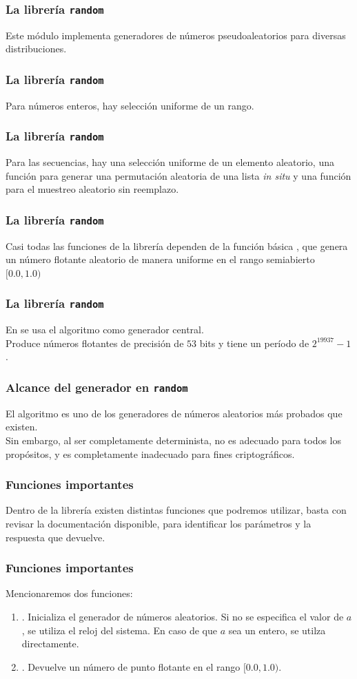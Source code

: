 \documentclass[12pt]{beamer}
\begin{document}
\begin{frame}
\frametitle{La librería \texttt{random}}
Este módulo implementa generadores de números pseudoaleatorios para diversas distribuciones.
\end{frame}
\begin{frame}
\frametitle{La librería \texttt{random}}
Para números enteros, hay selección uniforme de un rango.
\end{frame}
\begin{frame}
\frametitle{La librería \texttt{random}}
Para las secuencias, hay una selección uniforme de un elemento aleatorio, una función para generar una permutación aleatoria de una lista \emph{in situ} y una función para el muestreo aleatorio sin reemplazo.
\end{frame}
\begin{frame}
\frametitle{La librería \texttt{random}}
Casi todas las funciones de la librería dependen de la función básica , que genera un número flotante aleatorio de manera uniforme en el rango semiabierto $[0.0, 1.0)$
\end{frame}
\begin{frame}
\frametitle{La librería \texttt{random}}
En \python{} se usa el algoritmo  como generador central.
\\
\bigskip
\pause
Produce números flotantes de precisión de $53$ bits y tiene un período de $2^{19937}-1$.
\end{frame}
\begin{frame}
\frametitle{Alcance del generador en \texttt{random}}
El algoritmo  es uno de los generadores de números aleatorios más probados que existen.
\\
\bigskip
\pause
Sin embargo, al ser completamente determinista, no es adecuado para todos los propósitos, y es completamente inadecuado para fines criptográficos.
\end{frame}
\begin{frame}
\frametitle{Funciones importantes}
Dentro de la librería  existen distintas funciones que podremos utilizar, basta con revisar la documentación disponible, para identificar los parámetros y la respuesta que devuelve.
\end{frame}
\begin{frame}
\frametitle{Funciones importantes}
Mencionaremos dos funciones:
\begin{enumerate}[<+->]
\item {}. Inicializa el generador de números aleatorios. Si no se especifica el valor de $a$, se utiliza el reloj del sistema. En caso de que $a$ sea un entero, se utilza directamente.
\item {}. Devuelve un número de punto flotante en el rango $[0.0, 1.0)$.
\end{enumerate}
\end{frame}
\end{document}
